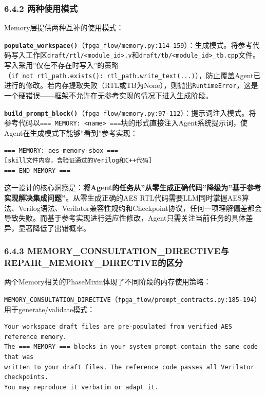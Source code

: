 \subsubsection{6.4.2
两种使用模式}\label{ux4e24ux79cdux4f7fux7528ux6a21ux5f0f}

Memory层提供两种互补的使用模式：

\textbf{\texttt{populate\_workspace()}}（\texttt{fpga\_flow/memory.py:114-159}）：生成模式。将参考代码写入工作区\texttt{draft/rtl/\textless{}module\_id\textgreater{}.v}和\texttt{draft/tb/\textless{}module\_id\textgreater{}\_tb.cpp}文件。写入采用''仅在不存在时写入''的策略（\texttt{if\ not\ rtl\_path.exists():\ rtl\_path.write\_text(...)}），防止覆盖Agent已进行的修改。若内存提取失败（RTL或TB为None），则抛出\texttt{RuntimeError}，这是一个硬错误------框架不允许在无参考实现的情况下进入生成阶段。

\textbf{\texttt{build\_prompt\_block()}}（\texttt{fpga\_flow/memory.py:97-112}）：提示词注入模式。将参考代码以\texttt{===\ MEMORY:\ \textless{}name\textgreater{}\ ===}块的形式直接注入Agent系统提示词，使Agent在生成模式下能够''看到''参考实现：

\begin{verbatim}
=== MEMORY: aes-memory-sbox ===
[skill文件内容，含验证通过的Verilog和C++代码]
=== END MEMORY ===
\end{verbatim}

这一设计的核心洞察是：\textbf{将Agent的任务从''从零生成正确代码''降级为''基于参考实现解决集成问题''}。从零生成正确的AES
RTL代码需要LLM同时掌握AES算法、Verilog语法、Verilator兼容性规约和Checkpoint协议，任何一项理解偏差都会导致失败。而基于参考实现进行适应性修改，Agent只需关注当前任务的具体差异，显著降低了出错概率。

\subsubsection{6.4.3
MEMORY\_CONSULTATION\_DIRECTIVE与REPAIR\_MEMORY\_DIRECTIVE的区分}\label{memory_consultation_directiveux4e0erepair_memory_directiveux7684ux533aux5206}

两个Memory相关的PhaseMixin体现了不同阶段的内存使用策略：

\texttt{MEMORY\_CONSULTATION\_DIRECTIVE}（\texttt{fpga\_flow/prompt\_contracts.py:185-194}）用于generate/validate模式：

\begin{verbatim}
Your workspace draft files are pre-populated from verified AES reference memory.
The === MEMORY === blocks in your system prompt contain the same code that was
written to your draft files. The reference code passes all Verilator checkpoints.
You may reproduce it verbatim or adapt it.
\end{verbatim}

